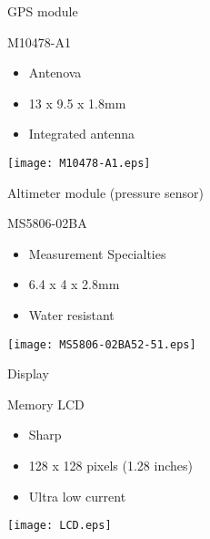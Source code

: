 \documentclass[compress,red]{beamer}
\begin{document}
\begin{frame}{GPS module}

  \begin{block}{M10478-A1}
    \begin{itemize}
    \item Antenova
    \item 13 x 9.5 x 1.8mm
    \item Integrated antenna
    \end{itemize}
  \end{block}

  \begin{center}
    \texttt{[image: M10478-A1.eps]}
  \end{center}

  \note[item]{}

\end{frame}

\begin{frame}{Altimeter module (pressure sensor)}

  \begin{block}{MS5806-02BA}
    \begin{itemize}
    \item Measurement Specialties
    \item 6.4 x 4 x 2.8mm
    \item Water resistant
    \end{itemize}
  \end{block}

  \begin{center}
    \texttt{[image: MS5806-02BA52-51.eps]}
  \end{center}

  \note[item]{}

\end{frame}

\begin{frame}{Display}

  \begin{block}{Memory LCD}
    \begin{itemize}
    \item Sharp
    \item 128 x 128 pixels (1.28 inches)
    \item Ultra low current
    \end{itemize}
  \end{block}


  \begin{center}
    \texttt{[image: LCD.eps]}
  \end{center}

  \note[item]{}

\end{frame}
\end{document}

